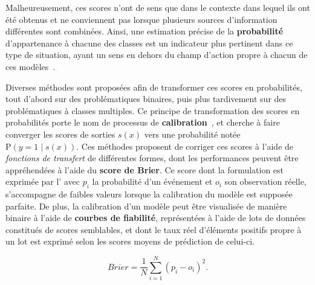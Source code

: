 Malheureusement, ces scores n'ont de sens que dans le contexte dans lequel ils ont été obtenus et ne conviennent pas lorsque plusieurs sources d'information différentes sont combinées. Ainsi, une estimation précise de la \textbf{probabilité} d'appartenance à chacune des classes est un indicateur plus pertinent dans ce type de situation, ayant un sens en dehors du champ d'action propre à chacun de ces modèles~\cite{Zadrozny2002}.\par

Diverses méthodes sont proposées afin de transformer ces scores en probabilités, tout d'abord sur des problématiques binaires, puis plus tardivement sur des problématiques à classes multiples. Ce principe de transformation des scores en probabilités porte le nom de processus de \textbf{calibration}~\cite{Murphy1977}, et cherche à faire converger les scores de sorties $s(x)$ vers une probabilité notée $\mathrm{P}(y=1 \mid s(x))$. Ces méthodes proposent de corriger ces scores à l'aide de \textit{fonctions de transfert} de différentes formes, dont les performances peuvent être appréhendées à l'aide du \textbf{score de Brier}. Ce score dont la formulation est exprimée par l' avec $p_i$ la probabilité d'un événement et $o_i$ son observation réelle, s'accompagne de faibles valeurs lorsque la calibration du modèle est supposée parfaite. De plus, la calibration d'un modèle peut être visualisée de manière binaire à l'aide de \textbf{courbes de fiabilité}, représentées à l'aide de lots de données constitués de scores semblables, et dont le taux réel d'éléments positifs propre à un lot est exprimé selon les scores moyens de prédiction de celui-ci.\par

\begin{equation} 
    \label{eq:brier_score}
    Brier = \frac{1}{N}\sum\limits _{i=1}^{N}(p_i-o_i)^2.
\end{equation}

